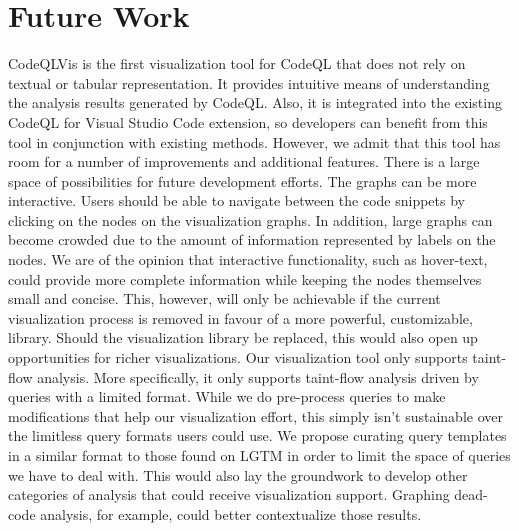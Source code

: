 \documentclass[sigplan,10pt,review]{acmart}
\begin{document}
\section{Future Work}
CodeQLVis is the first visualization tool for CodeQL that does not rely on textual or tabular representation. It provides intuitive means of understanding the analysis results generated by CodeQL. Also, it is integrated into the existing CodeQL for Visual Studio Code extension, so developers can benefit from this tool in conjunction with existing methods. However, we admit that this tool has room for a number of improvements and additional features. There is a large space of possibilities for future development efforts.
\newline
\indent The graphs can be more interactive. Users should be able to navigate between the code snippets by clicking on the nodes on the visualization graphs. In addition, large graphs can become crowded due to the amount of information represented by labels on the nodes. We are of the opinion that interactive functionality, such as hover-text, could provide more complete information while keeping the nodes themselves small and concise. This, however, will only be achievable if the current visualization process is removed in favour of a more powerful, customizable, library. Should the visualization library be replaced, this would also open up opportunities for richer visualizations.
\newline
\indent Our visualization tool only supports taint-flow analysis. More specifically, it only supports taint-flow analysis driven by queries with a limited format. While we do pre-process queries to make modifications that help our visualization effort, this simply isn't sustainable over the limitless query formats users could use. We propose curating query templates in a similar format to those found on LGTM in order to limit the space of queries we have to deal with. This would also lay the groundwork to develop other categories of analysis that could receive visualization support. Graphing dead-code analysis, for example, could better contextualize those results.
\end{document}

